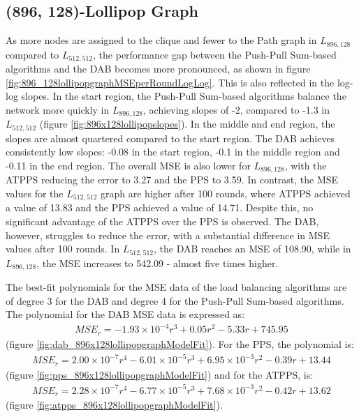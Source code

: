 \subsection{(896, 128)-Lollipop Graph}\label{subsec:896_128lollipop}
As more nodes are assigned to the clique and fewer to the Path graph in $L_{896,128}$ compared to $L_{512,512}$, the performance gap between the Push-Pull Sum-based algorithms and the DAB becomes more pronounced, as shown in figure \ref{fig:896_128lollipopgraphMSEperRoundLogLog}. This is also reflected in the log-log slopes. In the start region, the Push-Pull Sum-based algorithms balance the network more quickly in $L_{896,128}$, achieving slopes of -2, compared to -1.3 in $L_{512,512}$ (figure \ref{fig:896x128lollipopslopes}). In the middle and end region, the slopes are almost quartered compared to the start region. The DAB achieves consistently low slopes: -0.08 in the start region, -0.1 in the middle region and -0.11 in the end region. The overall MSE is also lower for $L_{896,128}$, with the ATPPS reducing the error to 3.27 and the PPS to 3.59. In contrast, the MSE values for the $L_{512,512}$ graph are higher after 100 rounds, where ATPPS achieved a value of 13.83 and the PPS achieved a value of 14.71. Despite this, no significant advantage of the ATPPS over the PPS is observed. The DAB, however, struggles to reduce the error, with a substantial difference in MSE values after 100 rounds. In $L_{512,512}$, the DAB reaches an MSE of 108.90, while in $L_{896,128}$, the MSE increases to 542.09 - almost five times higher.

The best-fit polynomials for the MSE data of the load balancing algorithms are of degree 3 for the DAB and degree 4 for the Push-Pull Sum-based algorithms. The polynomial for the DAB MSE data is expressed as:
\begin{align}
    MSE_r=-1.93\times 10^{-4}r^{3}+0.05r^{2}-5.33r+745.95    
\end{align}
(figure \ref{fig:dab_896x128lollipopgraphModelFit}). For the PPS, the polynomial is: 
\begin{align}
    MSE_r=2.00\times 10^{-7}r^{4}-6.01\times 10^{-5}r^{3}+6.95\times 10^{-3}r^{2}-0.39r+13.44
\end{align}
(figure \ref{fig:pps_896x128lollipopgraphModelFit}) and for the ATPPS, is:
\begin{align}
    MSE_r=2.28\times 10^{-7}r^{4}-6.77\times 10^{-5}r^{3}+7.68\times 10^{-3}r^{2}-0.42r+13.62    
\end{align}
(figure \ref{fig:atpps_896x128lollipopgraphModelFit}).

